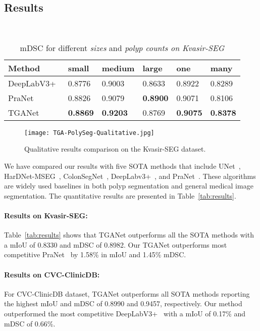 \documentclass[runningheads]{llncs}
\begin{document}
\subsection{Results}
\vspace{-2mm}
\begin{table}[t!]
    \centering
\caption{mDSC for different \textit{sizes} and \textit{polyp counts on Kvasir-SEG}}~\cite{jha2020kvasir}
    \begin{tabular}{ l| l| l| l| l| l} 
\toprule
Method &small & medium & large &one& many\\ \midrule
DeepLabV3+~\cite{chen2018encoder}  &0.8776 &0.9003  &0.8633  &0.8922 &0.8289  \\
PraNet~\cite{fan2020pranet} &0.8826  &0.9079 &\textbf{0.8900}  &0.9071  &0.8106   \\
TGANet  &\textbf{0.8869}  &\textbf{0.9203} &0.8769  &\textbf{0.9075}  &\textbf{0.8378}   \\
\bottomrule
    \end{tabular}
    \label{tganet-effect}
    \end{table}
\begin{figure} [!t]
    \centering
    \texttt{[image: TGA-PolySeg-Qualitative.jpg]} 
    \caption{Qualitative results comparison on the Kvasir-SEG dataset.}
    \label{fig:qualitative}
    \vspace{-5mm}
\end{figure}
We have compared our results with five SOTA methods that include UNet~\cite{ronneberger2015u}, HarDNet-MSEG~\cite{huang2021hardnet}, ColonSegNet~\cite{jha2021real}, DeepLabv3+~\cite{chen2018encoder}, and PraNet~\cite{fan2020pranet}. These algorithms are widely used baselines in both polyp segmentation and general medical image segmentation. The quantitative results are presented in Table~\ref{tab:results}.
\vspace{-3mm}
\paragraph{\textbf{Results on Kvasir-SEG:}}
Table~\ref{tab:results} shows that TGANet outperforms all the SOTA methods with a mIoU of 0.8330 and mDSC of 0.8982. Our TGANet outperforms most competitive PraNet~\cite{fan2020pranet} by 1.58\% in mIoU and 1.45\% mDSC. 
\vspace{-3mm}
\paragraph{\textbf{Results on CVC-ClinicDB:}}
For CVC-ClinicDB dataset, TGANet outperforms all SOTA methods reporting the highest mIoU and mDSC of 0.8990 and 0.9457, respectively. Our method outperformed the most competitive DeepLabV3+~\cite{chen2018encoder} with a mIoU of 0.17\% and mDSC of 0.66\%.   
\vspace{-3mm}
\end{document}

